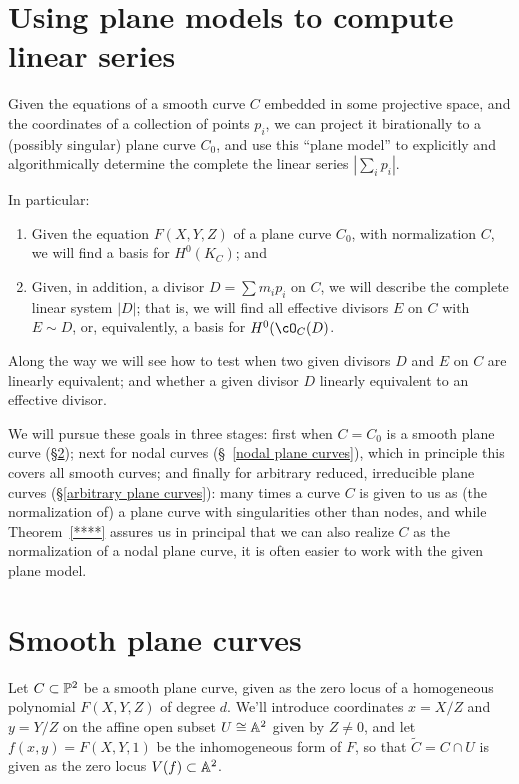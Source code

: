\section{Using plane models to compute linear series}

Given the equations of a smooth curve $C$ embedded in some projective space, and the coordinates of a collection of points $p_i$,  we can project it birationally to a (possibly singular) plane curve $C_0$, and use this ``plane model'' to explicitly and algorithmically determine the complete the linear series 
$|\sum_i p_i|$. 

In particular:
\begin{enumerate}
\item Given the equation $F(X,Y,Z)$ of a plane curve $C_0$, with normalization $C$, we will find a basis for $H^0(K_C)$; and
\item  Given, in addition, a divisor $D = \sum m_ip_i$ on $C$, we will describe the complete linear system $|D|$; that is, we will find all effective divisors $E$ on $C$ with $E \sim D$, or, equivalently, a basis for $H^0(\cO_C(D)$.
\end{enumerate}

Along the way we will see how to test when two given divisors $D$ and $E$ on $C$ are linearly equivalent; and whether a given divisor $D$ linearly equivalent to an effective divisor.

We will pursue these goals in three stages: first when $C = C_0$ is a smooth plane curve (\S \ref{smooth plane curves}); next for nodal curves (\S~\ref{nodal plane curves}), which in principle this covers all smooth curves; and finally for arbitrary reduced, irreducible plane curves (\S\ref{arbitrary plane curves}): many times a curve $C$ is given to us as (the normalization of) a plane curve with singularities other than nodes, and while Theorem~\ref{****} assures us in principal that we can also realize $C$ as the normalization of a nodal plane curve, it is often easier to work with the given plane model. 

\section{Smooth plane curves}\label{smooth plane curves}

Let $C \subset \PP^2$  be a smooth plane curve, given as the zero locus of a homogeneous polynomial $F(X,Y,Z)$ of degree $d$. We'll introduce coordinates $x = X/Z$ and $y = Y/Z$ on the affine open subset $U \cong \AA^2$ given by $Z \neq 0$, and let $f(x,y) = F(X,Y,1)$ be the inhomogeneous form of $F$, so that $\tilde C = C \cap U$ is given as the zero locus $V(f) \subset  \AA^2$. 

